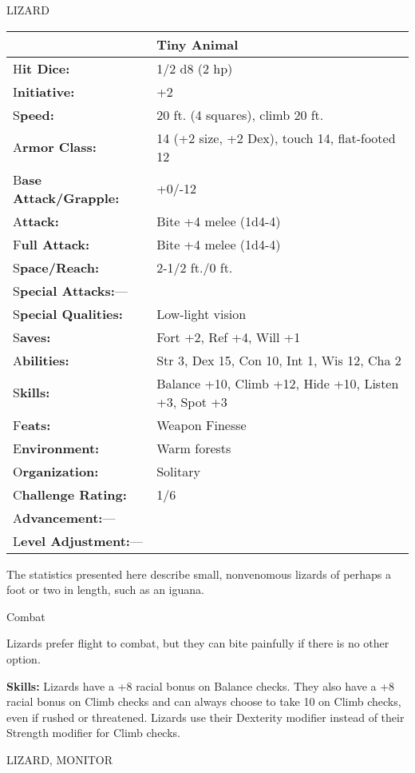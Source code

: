\documentclass{article}
\begin{document}
\vspace{12pt}
LIZARD

\begin{tabular}{|>{\raggedright}p{91pt}|>{\raggedright}p{219pt}|}
\hline
  & Tiny Animal\tabularnewline
\hline
H\textbf{it Dice:} & 1/2 d8 (2 hp)\tabularnewline
\hline
I\textbf{nitiative:} & +2\tabularnewline
\hline
S\textbf{peed:} & 20 ft. (4 squares), climb 20 ft.\tabularnewline
\hline
A\textbf{rmor Class:} & 14 (+2 size, +2 Dex), touch 14, flat-footed 12\tabularnewline
\hline
B\textbf{ase Attack/Grapple:} & +0/-12\tabularnewline
\hline
A\textbf{ttack:} & Bite +4 melee (1d4-4)\tabularnewline
\hline
F\textbf{ull Attack:} & Bite +4 melee (1d4-4)\tabularnewline
\hline
S\textbf{pace/Reach:} & 2-1/2 ft./0 ft.\tabularnewline
\hline
S\textbf{pecial Attacks:}--- & \tabularnewline
\hline
S\textbf{pecial Qualities:} & Low-light vision\tabularnewline
\hline
S\textbf{aves:} & Fort +2, Ref +4, Will +1\tabularnewline
\hline
A\textbf{bilities:} & Str 3, Dex 15, Con 10, Int 1, Wis 12, Cha 2\tabularnewline
\hline
S\textbf{kills:} & Balance +10, Climb +12, Hide +10, Listen +3, Spot +3\tabularnewline
\hline
F\textbf{eats:} & Weapon Finesse\tabularnewline
\hline
E\textbf{nvironment:} & Warm forests\tabularnewline
\hline
O\textbf{rganization:} & Solitary\tabularnewline
\hline
C\textbf{hallenge Rating:} & 1/6\tabularnewline
\hline
A\textbf{dvancement:}--- & \tabularnewline
\hline
L\textbf{evel Adjustment:}--- & \tabularnewline
\hline
\end{tabular}

\vspace{12pt}
The statistics presented here describe small, nonvenomous lizards of perhaps a 
foot or two in length, such as an iguana.

Combat

Lizards prefer flight to combat, but they can bite painfully if there is no other 
option.

\textbf{Skills:} Lizards have a +8 racial bonus on Balance checks. They also have 
a +8 racial bonus on Climb checks and can always choose to take 10 on Climb checks, 
even if rushed or threatened. Lizards use their Dexterity modifier instead of their 
Strength modifier for Climb checks.

\vspace{12pt}
LIZARD, MONITOR
\end{document}
